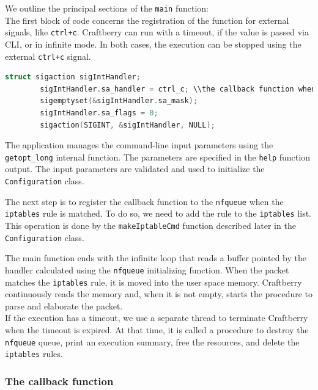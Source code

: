 \documentclass[12pt]{article}
\begin{document}
	We outline the principal sections of the \lstinline{main} function:\\
	The first block of code concerns the registration of the function for external signals, like \lstinline{ctrl+c}. Craftberry can run with a timeout, if the value is passed via CLI, or in infinite mode. In both cases, the execution can be stopped using the external \lstinline{ctrl+c} signal.\\
	\bigbreak

	\begin{lstlisting}[frame=single, language=C++]
		struct sigaction sigIntHandler;
		sigIntHandler.sa_handler = ctrl_c; \\the callback function when the signal is emitted
		sigemptyset(&sigIntHandler.sa_mask);
		sigIntHandler.sa_flags = 0;
		sigaction(SIGINT, &sigIntHandler, NULL);
	\end{lstlisting}
	\bigbreak
	
	The application manages the command-line input parameters using the \lstinline{getopt_long} internal function. The parameters are specified in the \lstinline{help} function output. The input parameters are validated and used to initialize the \lstinline{Configuration} class.\\
	\bigbreak

	The next step is to register the callback function to the \lstinline{nfqueue} when the \lstinline{iptables} rule is matched. To do so, we need to add the rule to the \lstinline{iptables} list. This operation is done by the \lstinline{makeIptableCmd} function described later in the \lstinline{Configuration} class.\\
	\bigbreak

	The main function ends with the infinite loop that reads a buffer pointed by the handler calculated using the \lstinline{nfqueue} initializing function. When the packet matches the \lstinline{iptables} rule, it is moved into the user space memory. Craftberry continuously reads the memory and, when it is not empty, starts the procedure to parse and elaborate the packet.\\

	If the execution has a timeout, we use a separate thread to terminate Craftberry when the timeout is expired. At that time, it is called a procedure to destroy the \lstinline{nfqueue} queue, print an execution summary, free the resources, and delete the \lstinline{iptables} rules.

	\subsubsection{The callback function}
\end{document}
